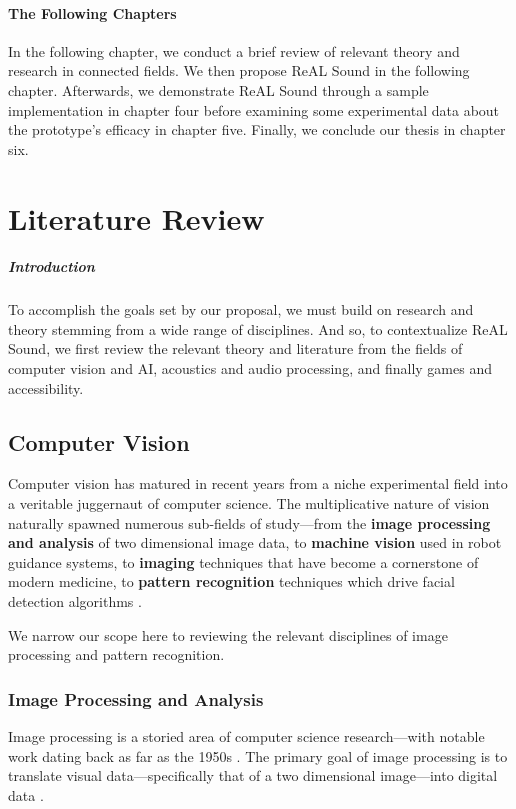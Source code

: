 \documentclass{report}
\newcommand{\rs}{ReAL Sound\xspace}
\newcommand{\tech}[1]{\textbf{#1}}
\begin{document}
\subsubsection{The Following Chapters}
In the following chapter, we conduct a brief review of relevant theory and research in connected fields. We then propose \rs in the following chapter. Afterwards, we demonstrate \rs through a sample implementation in chapter four before examining some experimental data about the prototype's efficacy in chapter five. Finally, we conclude our thesis in chapter six.


\chapter{Literature Review} 

\paragraph{Introduction}

To accomplish the goals set by our proposal, we must build on research and theory stemming from a wide range of disciplines. And so, to contextualize \rs, we first review the relevant theory and literature from the fields of computer vision and AI, acoustics and audio processing, and finally games and accessibility.

\section{Computer Vision}

Computer vision has matured in recent years from a niche experimental field into a veritable juggernaut of computer science. The multiplicative nature of vision naturally spawned numerous sub-fields of study---from the \tech{image processing and analysis} of two dimensional image data, to \tech{machine vision} used in robot guidance systems, to \tech{imaging} techniques that have become a cornerstone of modern medicine, to \tech{pattern recognition} techniques which drive facial detection algorithms \cite{dobson2023birth}. 

We narrow our scope here to reviewing the relevant disciplines of image processing and pattern recognition. 

\subsection{Image Processing and Analysis}
Image processing is a storied area of computer science research---with notable work dating back as far as the 1950s \cite{imageprocessing}. The primary goal of image processing is to translate visual data---specifically that of a two dimensional image---into digital data \cite{marion2013introduction}. 
\end{document}
